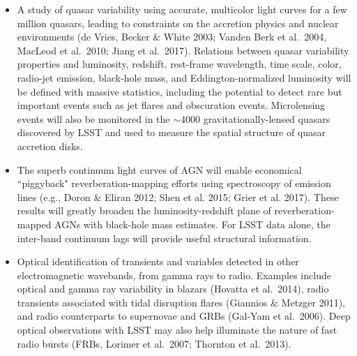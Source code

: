 \begin{itemize}
\item A study of quasar variability using accurate, multicolor light
  curves for a few million
quasars, leading to constraints on the accretion physics and nuclear environments (de Vries, Becker
\& White 2003; Vanden Berk et al.~2004, MacLeod et al.~2010; Jiang et al.~2017). Relations between quasar variability
      properties and luminosity, redshift,
      rest-frame wavelength, time scale, color, radio-jet emission, black-hole
      mass, and Eddington-normalized luminosity will be defined with massive
      statistics, including the potential to detect rare but important events such as
      jet flares and obscuration events. Microlensing events will also be monitored in the $\sim$4000 gravitationally-lensed
      quasars discovered by LSST and used to measure the spatial structure of quasar accretion disks.

\item The superb continuum light curves of AGN will enable economical ``piggyback"
      reverberation-mapping efforts using spectroscopy of emission lines (e.g., Doron \& Eliran 2012; Shen et al. 2015; Grier et al. 2017). These results
      will greatly broaden the luminosity-redshift plane of reverberation-mapped AGNs
      with black-hole mass estimates. For LSST data alone, the inter-band continuum lags
      will provide useful structural information.

\item Optical identification of transients and variables detected in
  other electromagnetic wavebands, from gamma rays to radio. Examples
  include optical and gamma ray variability in blazars (Hovatta et
  al.~2014), radio transients associated with tidal disruption flares
  (Giannios \& Metzger 2011), and radio counterparts to supernovae and
  GRBs (Gal-Yam et al.~2006). Deep optical observations with LSST may
  also help illuminate the nature of fast radio bursts (FRBs, Lorimer et al.~2007; Thornton et al.~2013).


\end{itemize}
